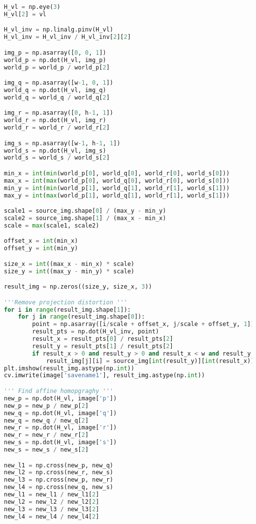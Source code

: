 \documentclass[11pt]{article}
\begin{document}
\begin{lstlisting}[language=Python, showstringspaces=false]
H_vl = np.eye(3)
H_vl[2] = vl

H_vl_inv = np.linalg.pinv(H_vl)
H_vl_inv = H_vl_inv / H_vl_inv[2][2]

img_p = np.asarray([0, 0, 1])
world_p = np.dot(H_vl, img_p)
world_p = world_p / world_p[2]

img_q = np.asarray([w-1, 0, 1])
world_q = np.dot(H_vl, img_q)
world_q = world_q / world_q[2]

img_r = np.asarray([0, h-1, 1])
world_r = np.dot(H_vl, img_r)
world_r = world_r / world_r[2]

img_s = np.asarray([w-1, h-1, 1])
world_s = np.dot(H_vl, img_s)
world_s = world_s / world_s[2]

min_x = int(min(world_p[0], world_q[0], world_r[0], world_s[0]))
max_x = int(max(world_p[0], world_q[0], world_r[0], world_s[0]))
min_y = int(min(world_p[1], world_q[1], world_r[1], world_s[1]))
max_y = int(max(world_p[1], world_q[1], world_r[1], world_s[1]))

scale1 = source_img.shape[0] / (max_y - min_y)
scale2 = source_img.shape[1] / (max_x - min_x)
scale = max(scale1, scale2)

offset_x = int(min_x) 
offset_y = int(min_y) 

size_x = int((max_x - min_x) * scale)
size_y = int((max_y - min_y) * scale)

result_img = np.zeros((size_y, size_x, 3))

'''Remove projection distortion '''
for i in range(result_img.shape[1]):
    for j in range(result_img.shape[0]):
        point = np.asarray([i/scale + offset_x, j/scale + offset_y, 1])
        result_pts = np.dot(H_vl_inv, point)
        result_x = result_pts[0] / result_pts[2]
        result_y = result_pts[1] / result_pts[2]
        if result_x > 0 and result_y > 0 and result_x < w and result_y < h:
            result_img[j][i] = source_img[int(result_y)][int(result_x)]
plt.imshow(result_img.astype(np.int))
cv.imwrite(image['savename1'], result_img.astype(np.int))

''' Find affine homopgraghy '''
new_p = np.dot(H_vl, image['p'])
new_p = new_p / new_p[2]
new_q = np.dot(H_vl, image['q'])
new_q = new_q / new_q[2]
new_r = np.dot(H_vl, image['r'])
new_r = new_r / new_r[2]
new_s = np.dot(H_vl, image['s'])
new_s = new_s / new_s[2]

new_l1 = np.cross(new_p, new_q)
new_l2 = np.cross(new_r, new_s)
new_l3 = np.cross(new_p, new_r)
new_l4 = np.cross(new_q, new_s)
new_l1 = new_l1 / new_l1[2]
new_l2 = new_l2 / new_l2[2]
new_l3 = new_l3 / new_l3[2]
new_l4 = new_l4 / new_l4[2]


\end{lstlisting}
\end{document}
